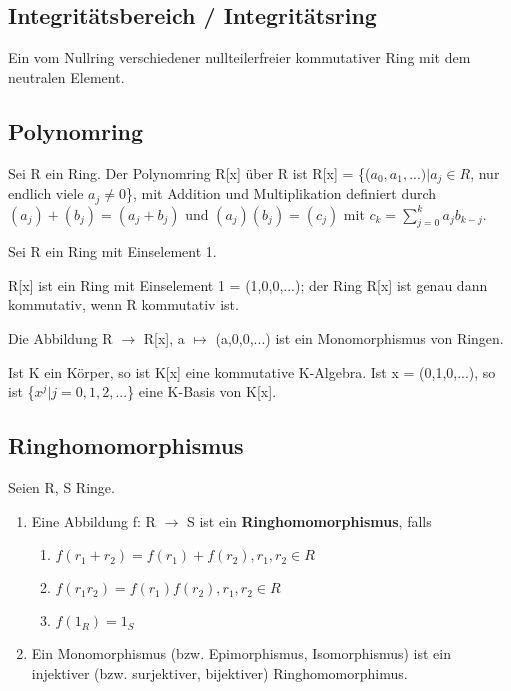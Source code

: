 \subsection{Integritätsbereich / Integritätsring}
Ein vom Nullring verschiedener nullteilerfreier kommutativer Ring mit dem neutralen Element.

\subsection{Polynomring}
\begin{definition}
Sei R ein Ring. Der Polynomring R[x] über R ist R[x] = \{($a_0,a_1,...) | a_j \in R$, nur endlich viele $a_j \neq 0$\},
mit Addition und Multiplikation definiert durch $(a_j) + (b_j) = (a_j + b_j)$ und $(a_j)(b_j) = (c_j)$ mit $c_k = \sum\nolimits_{j=0}^{k} a_j b_{k-j}$.
\end{definition}

\begin{lemma}
Sei R ein Ring mit Einselement 1.
\begin{compactenum}
\item R[x] ist ein Ring mit Einselement 1 = (1,0,0,...); der Ring R[x] ist genau dann kommutativ, wenn R kommutativ ist.
\item Die Abbildung R $\to$ R[x], a $\mapsto$ (a,0,0,...) ist ein Monomorphismus von Ringen.
\item Ist K ein Körper, so ist K[x] eine kommutative K-Algebra. Ist x = (0,1,0,...), so ist \{$x^j | j = 0,1,2,...$\} eine K-Basis von K[x].
\end{compactenum}
\end{lemma}


\subsection{Ringhomomorphismus}
\begin{definition}
Seien R, S Ringe.
\begin{enumerate}
\item Eine Abbildung f: R $\to$ S ist ein \textbf{Ringhomomorphismus}, falls
\begin{enumerate}
\item $f(r_1 +r_2) = f(r_1) + f(r_2), r_1,r_2 \in R$
\item $f(r_1r_2) = f(r_1)f(r_2), r_1,r_2 \in R$
\item $f(1_R) = 1_S$
\end{enumerate}
\item Ein Monomorphismus (bzw. Epimorphismus, Isomorphismus) ist ein injektiver (bzw. surjektiver, bijektiver) Ringhomomorphimus.
\end{enumerate}
\end{definition}


